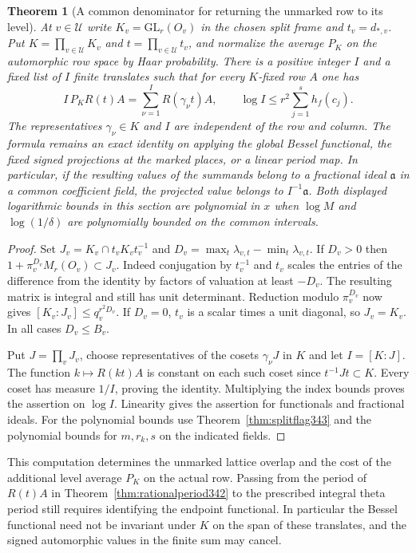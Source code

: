 \documentclass[a4paper,11pt]{article}
\newtheorem{theorem}[proposition]{Theorem}
\theoremstyle{definition}
\theoremstyle{remark}
\numberwithin{equation}{section}
\begin{document}
\begin{theorem}[A common denominator for returning the unmarked row to its level]\leavevmode\label{thm:unmarkedtrace343}
At $v\in\mathcal U$ write $K_v=\mathrm{GL}_r(O_v)$ in the chosen
split frame and $t_v=d_{*,v}$. Put $K=\prod_{v\in\mathcal U} K_v$
and $t=\prod_{v\in\mathcal U}t_v$, and normalize the average $P_K$
on the automorphic row space by Haar probability. There is a positive
integer $I$ and a fixed list of $I$ finite translates such that for
every $K$-fixed row $A$ one has
\[
   I\,P_K R(t) A=\sum_{\nu=1}^{I} R(\gamma_\nu t) A,
          \qquad \log I\le r^2\sum_{j=1}^s h_f(c_j).
\]
The representatives $\gamma_\nu\in K$ and $I$ are independent of
the row and column. The formula remains an exact identity on applying
the global Bessel functional, the fixed signed projections at the
marked places, or a linear period map. In particular, if the resulting
values of the summands belong to a fractional ideal $\mathfrak a$
in a common coefficient field, the projected value belongs to
$I^{-1}\mathfrak a$. Both displayed logarithmic bounds in this section
are polynomial in $x$ when $\log M$ and $\log(1/\delta)$ are
polynomially bounded on the common intervals.
\end{theorem}
\begin{proof}
Set $J_v=K_v\cap t_vK_vt_v^{-1}$ and
$D_v=\max_t\lambda_{v,t}-\min_t\lambda_{v,t}$. If $D_v>0$ then
$1+\pi_v^{D_v}M_r(O_v)\subset J_v$. Indeed conjugation by $t_v^{-1}$
and $t_v$ scales the entries of the difference from the identity by
factors of valuation at least $-D_v$. The resulting matrix is
integral and still has unit determinant. Reduction modulo
$\pi_v^{D_v}$ now gives
$[K_v:J_v]\le q_v^{r^2D_v}$. If $D_v=0$, $t_v$ is a scalar times
a unit diagonal, so $J_v=K_v$. In all cases $D_v\le B_v$.

Put $J=\prod_v J_v$, choose representatives of the cosets
$\gamma_\nu J$ in $K$ and let $I=[K:J]$. The function
$k\mapsto R(kt)A$ is constant on each such coset since
$t^{-1}Jt\subset K$. Every coset has measure $1/I$, proving the
identity. Multiplying the index bounds proves the assertion on
$\log I$. Linearity gives the assertion for functionals and fractional
ideals. For the polynomial bounds use Theorem~\ref{thm:splitflag343}
and the polynomial bounds for $m,r_k,s$ on the indicated fields.
\end{proof}

This computation determines the unmarked lattice overlap and the
cost of the additional level average $P_K$ on the actual row.
Passing from the period of $R(t)A$ in
Theorem~\ref{thm:rationalperiod342} to the prescribed integral
theta period still requires identifying the endpoint functional.
In particular the Bessel functional need not be invariant under $K$
on the span of these translates, and the signed automorphic values
in the finite sum may cancel.
\end{document}
